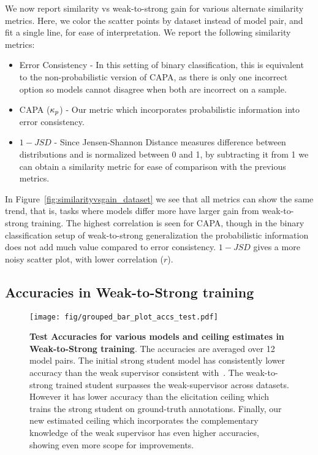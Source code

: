 We now report similarity vs weak-to-strong gain for various alternate similarity metrics. Here, we color the scatter points by dataset instead of model pair, and fit a single line, for ease of interpretation. We report the following similarity metrics:
\begin{itemize}
    \item Error Consistency - In this setting of binary classification, this is equivalent to the non-probabilistic version of CAPA, as there is only one incorrect option so models cannot disagree when both are incorrect on a sample.
    \item CAPA ($\kappa_{p}$) - Our metric which incorporates probabilistic information into error consistency.
    \item $1 - JSD$ - Since Jensen-Shannon Distance measures difference between distributions and is normalized between 0 and 1, by subtracting it from 1 we can obtain a similarity metric for ease of comparison with the previous metrics.
\end{itemize}

In Figure~\ref{fig:similarityvsgain_dataset} we see that all metrics can show the same trend, that is, tasks where models differ more have larger gain from weak-to-strong training. The highest correlation is seen for CAPA, though in the binary classification setup of weak-to-strong generalization the probabilistic information does not add much value compared to error consistency. $1 - JSD$ gives a more noisy scatter plot, with lower correlation ($r$).

\subsection{Accuracies in Weak-to-Strong training}
\begin{figure}[t]
    \centering
    \texttt{[image: fig/grouped\_bar\_plot\_accs\_test.pdf]}
    \caption{\textbf{Test Accuracies for various models and ceiling estimates in Weak-to-Strong training}. The accuracies are averaged over 12 model pairs. The initial strong student model has consistently lower accuracy than the weak supervisor consistent with~\citet{burns2024weaktostrong, scherlis2024w2seleuther}. The weak-to-strong trained student surpasses the weak-supervisor across datasets. However it has lower accuracy than the elicitation ceiling which trains the strong student on ground-truth annotations. Finally, our new estimated ceiling which incorporates the complementary knowledge of the weak supervisor has even higher accuracies, showing even more scope for improvements.}
    \label{fig:w2sacctest}
\end{figure}

